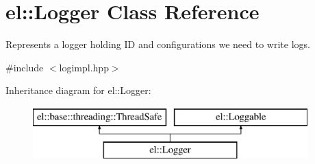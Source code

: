 \hypertarget{classel_1_1Logger}{\section{el\-:\-:Logger Class Reference}
\label{classel_1_1Logger}
}


Represents a logger holding I\-D and configurations we need to write logs.  




{\ttfamily \#include $<$logimpl.\-hpp$>$}

Inheritance diagram for el\-:\-:Logger\-:\begin{figure}[H]
\begin{center}
\leavevmode
\includegraphics[height=2.000000cm]{classel_1_1Logger}
\end{center}
\end{figure}
